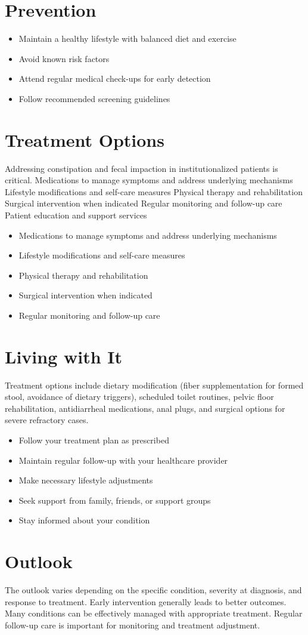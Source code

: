 \section{Prevention}
\begin{itemize}[noitemsep]
  \item Maintain a healthy lifestyle with balanced diet and exercise
  \item Avoid known risk factors
  \item Attend regular medical check-ups for early detection
  \item Follow recommended screening guidelines
\end{itemize}
\section{Treatment Options}
Addressing constipation and fecal impaction in institutionalized patients is critical. Medications to manage symptoms and address underlying mechanisms Lifestyle modifications and self-care measures Physical therapy and rehabilitation Surgical intervention when indicated Regular monitoring and follow-up care Patient education and support services

\begin{itemize}[noitemsep]
  \item Medications to manage symptoms and address underlying mechanisms
  \item Lifestyle modifications and self-care measures
  \item Physical therapy and rehabilitation
  \item Surgical intervention when indicated
  \item Regular monitoring and follow-up care
\end{itemize}
\section{Living with It}
Treatment options include dietary modification (fiber supplementation for formed stool, avoidance of dietary triggers), scheduled toilet routines, pelvic floor rehabilitation, antidiarrheal medications, anal plugs, and surgical options for severe refractory cases.

\begin{itemize}[noitemsep]
  \item Follow your treatment plan as prescribed
  \item Maintain regular follow-up with your healthcare provider
  \item Make necessary lifestyle adjustments
  \item Seek support from family, friends, or support groups
  \item Stay informed about your condition
\end{itemize}
\section{Outlook}
The outlook varies depending on the specific condition, severity at diagnosis, and response to treatment. Early intervention generally leads to better outcomes. Many conditions can be effectively managed with appropriate treatment. Regular follow-up care is important for monitoring and treatment adjustment.
